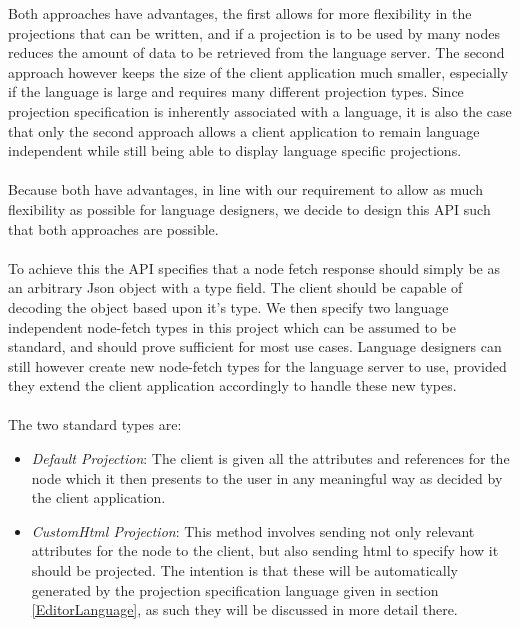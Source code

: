 \documentclass{report}
\begin{document}
Both approaches have advantages, the first allows for more flexibility in the projections that can be written, and if a projection is to be used by many nodes reduces the amount of data to be retrieved from the language server. The second approach however keeps the size of the client application much smaller, especially if the language is large and requires many different projection types. Since projection specification is inherently associated with a language, it is also the case that only the second approach allows a client application to remain language independent while still being able to display language specific projections.
\\
\\
Because both have advantages, in line with our \RCustom requirement to allow as much flexibility as possible for language designers, we decide to design this API such that both approaches are possible.
\\
\\
To achieve this the API specifies that a node fetch response should simply be as an arbitrary Json object with a type field. The client should be capable of decoding the object based upon it's type. We then specify two language independent node-fetch types in this project which can be assumed to be standard, and should prove sufficient for most use cases. Language designers can still however create new node-fetch types for the language server to use, provided they extend the client application accordingly to handle these new types.
\\
\\
The two standard types are:
\begin{itemize}
\item \emph{Default Projection}: The client is given all the attributes and references for the node which it then presents to the user in any meaningful way as decided by the client application.
\item \emph{CustomHtml Projection}: This method involves sending not only relevant attributes for the node to the client, but also sending html to specify how it should be projected. The intention is that these will be automatically generated by the projection specification language given in section \ref{EditorLanguage}, as such they will be discussed in more detail there.
\end{itemize}

\end{document}
